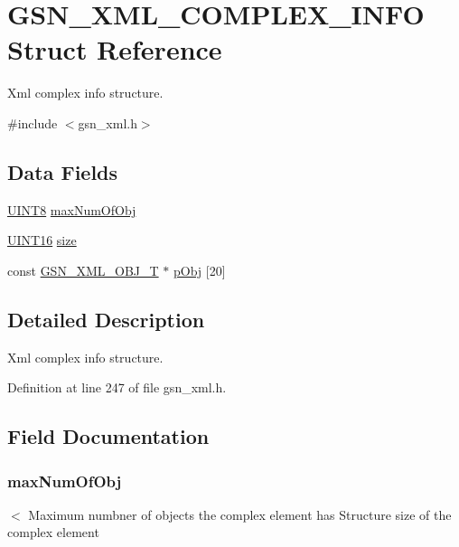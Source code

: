 \hypertarget{a00429}{
\section{GSN\_\-XML\_\-COMPLEX\_\-INFO Struct Reference}
\label{a00429}
}


Xml complex info structure.  




{\ttfamily \#include $<$gsn\_\-xml.h$>$}

\subsection*{Data Fields}
\begin{DoxyCompactItemize}
\item 
\hyperlink{a00660_gab27e9918b538ce9d8ca692479b375b6a}{UINT8} \hyperlink{a00429_adf6bd56dedec4904ff5d5f394818e086}{maxNumOfObj}
\item 
\hyperlink{a00660_ga09f1a1fb2293e33483cc8d44aefb1eb1}{UINT16} \hyperlink{a00429_a68890417cb73114517d0d8c594bd282e}{size}
\item 
const \hyperlink{a00435}{GSN\_\-XML\_\-OBJ\_\-T} $\ast$ \hyperlink{a00429_a82d8a5e6155232806b66fedff1fb91fb}{pObj} \mbox{[}20\mbox{]}
\end{DoxyCompactItemize}


\subsection{Detailed Description}
Xml complex info structure. 

Definition at line 247 of file gsn\_\-xml.h.



\subsection{Field Documentation}
\hypertarget{a00429_adf6bd56dedec4904ff5d5f394818e086}{
\subsubsection[{maxNumOfObj}]{ {\bf maxNumOfObj}}}
\label{a00429_adf6bd56dedec4904ff5d5f394818e086}
$<$ Maximum numbner of objects the complex element has Structure size of the complex element 

